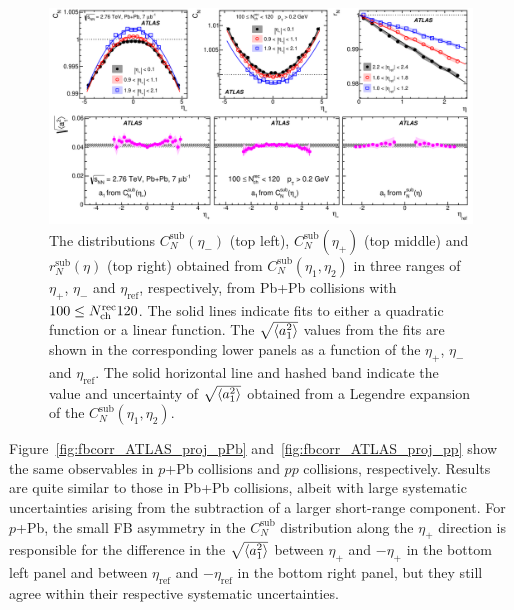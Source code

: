 \begin{figure}[H]
\centering
\includegraphics[width=.95\linewidth]{figs/chapter_fbcorr/ATLAS_proj_PbPb.pdf}
\caption{The distributions $C_N^\text{sub}(\eta_-)$ (top left), $C_N^\text{sub}(\eta_+)$ (top middle) and $r_N^\text{sub}(\eta)$ (top right) obtained from $C_N^\text{sub}(\eta_1, \eta_2)$ in three ranges of $\eta_+$, $\eta_-$ and $\eta_\text{ref}$, respectively, from Pb+Pb collisions with $100 \le N_\text{ch}^\text{rec} 120$. The solid lines indicate fits to either a quadratic function or a linear function. The $\sqrt{\left\langle a_1^2\right\rangle}$ values from the fits are shown in the corresponding lower panels as a function of the $\eta_+$, $\eta_-$ and $\eta_\text{ref}$. The solid horizontal line and hashed band indicate the value and uncertainty of $\sqrt{\left\langle a_1^2\right\rangle}$ obtained from a Legendre expansion of the $C_N^\text{sub}(\eta_1, \eta_2)$.}
\label{fig:fbcorr_ATLAS_proj_PbPb}
\end{figure}

Figure~\ref{fig:fbcorr_ATLAS_proj_pPb} and~\ref{fig:fbcorr_ATLAS_proj_pp} show the same observables in $p$+Pb collisions and $pp$ collisions, respectively. Results are quite similar to those in Pb+Pb collisions, albeit with large systematic uncertainties arising from the subtraction of a larger short-range component. For $p$+Pb, the small FB asymmetry in the $C_N^\text{sub}$ distribution along the $\eta_+$ direction is responsible for the difference in the $\sqrt{\left\langle a_1^2\right\rangle}$ between $\eta_+$ and $-\eta_+$ in the bottom left panel and  between $\eta_\text{ref}$ and $-\eta_\text{ref}$ in the bottom right panel, but they still agree within their respective systematic uncertainties.

